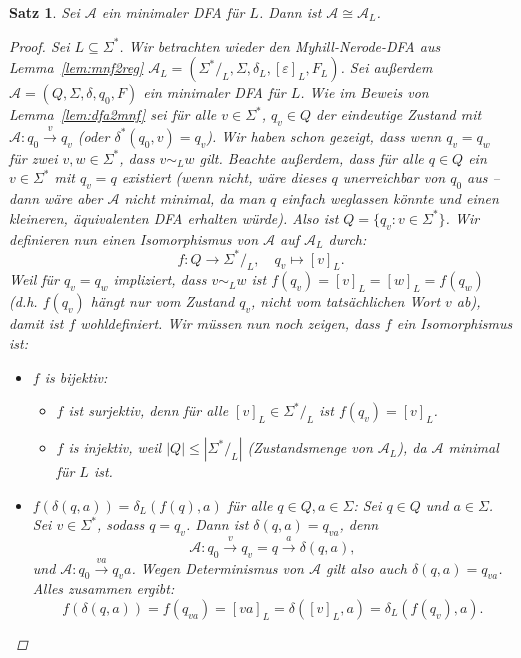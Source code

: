 \documentclass[11pt, a4paper]{article}
\theoremstyle{definition}
\theoremstyle{plain}
\newtheorem{theorem}[definition]{Satz}
\numberwithin{equation}{section}
\newcommand{\reaches}{\xrightarrow}
\begin{document}
\begin{theorem}\label{thm:mindfaunique}
	Sei $\mathcal{A}$ ein minimaler DFA für $L$. Dann ist $\mathcal{A} \cong \mathcal{A}_L$.
	\begin{proof}
		Sei $L \subseteq \Sigma^\ast$. Wir betrachten wieder den Myhill-Nerode-DFA aus Lemma~\ref{lem:mnf2reg} $\mathcal{A}_L = (\Sigma^\ast/_L, \Sigma, \delta_L, [\varepsilon]_L, F_L)$. Sei außerdem $\mathcal{A} = (Q, \Sigma, \delta, q_0, F)$ ein minimaler DFA für $L$. Wie im Beweis von Lemma~\ref{lem:dfa2mnf} sei für alle $v \in \Sigma^\ast$, $q_v \in Q$ der eindeutige Zustand mit $\mathcal{A}: q_0 \reaches{v} q_v$ (oder $\delta^\ast(q_0, v) = q_v$). Wir haben schon gezeigt, dass wenn $q_v = q_w$ für zwei $v, w \in \Sigma^\ast$, dass $v \sim_L w$ gilt. Beachte außerdem, dass für alle $q \in Q$ ein $v \in \Sigma^\ast$ mit $q_v = q$ existiert (wenn nicht, wäre dieses $q$ unerreichbar von $q_0$ aus -- dann wäre aber $\mathcal{A}$ nicht minimal, da man $q$ einfach weglassen könnte und einen kleineren, äquivalenten DFA erhalten würde). Also ist $Q = \{q_v : v \in \Sigma^\ast\}$. Wir definieren nun einen Isomorphismus von $\mathcal{A}$ auf $\mathcal{A}_L$ durch:
		$$
			f\colon Q \to \Sigma^\ast/_L, \quad q_v \mapsto [v]_L.
		$$
		Weil für $q_v = q_w$ impliziert, dass $v \sim_L w$ ist $f(q_v) = [v]_L = [w]_L = f(q_w)$ (d.h. $f(q_v)$ hängt nur vom Zustand $q_v$, nicht vom tatsächlichen Wort $v$ ab), damit ist $f$ wohldefiniert. Wir müssen nun noch zeigen, dass $f$ ein Isomorphismus ist:
		\begin{itemize}
			\item $f$ is bijektiv:
				\begin{itemize}
					\item $f$ ist surjektiv, denn für alle $[v]_L \in \Sigma^\ast/_L$ ist $f(q_v) = [v]_L$.
					\item $f$ is injektiv, weil $|Q| \leq |\Sigma^\ast/_L|$ (Zustandsmenge von $\mathcal{A}_L$), da $\mathcal{A}$ minimal für $L$ ist.
				\end{itemize}
			\item $f(\delta(q, a)) = \delta_L(f(q), a)$ für alle $q \in Q, a\in \Sigma$: Sei $q \in Q$ und $a \in \Sigma$. Sei $v \in \Sigma^\ast$, sodass $q = q_v$. Dann ist $\delta(q, a) = q_{va}$, denn
				$$
					\mathcal{A}: q_0 \reaches{v} q_v = q \reaches{a} \delta(q, a), 
				$$
				und $\mathcal{A}: q_0 \reaches{va} q_va$. Wegen Determinismus von $\mathcal{A}$ gilt also auch $\delta(q, a) = q_{va}$. Alles zusammen ergibt:
				$$
					f(\delta(q, a)) = f(q_{va}) = [va]_L = \delta([v]_L, a) = \delta_L(f(q_v), a).
$$
\end{itemize}
\end{proof}
\end{theorem}
\end{document}

